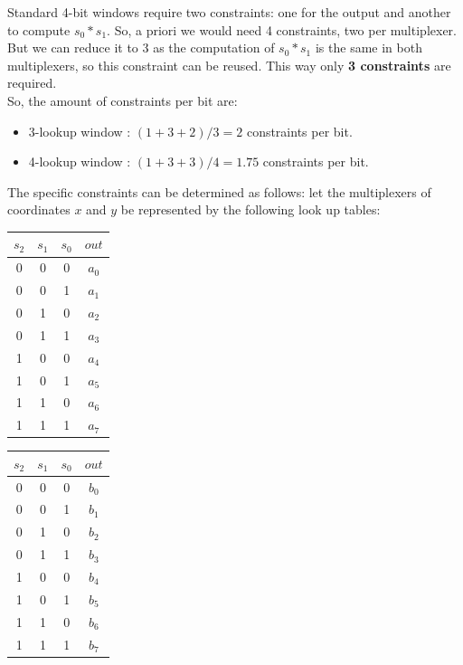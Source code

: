 \documentclass{article}
\begin{document}
\begin{spacing}{1.2}
	Standard 4-bit windows require two constraints: one for the output and another to compute $s_0*s_1$. So, a priori we would need 4 constraints, two per multiplexer. But we can reduce it to 3 as the computation of $s_0*s_1$ is the same in both multiplexers, so this constraint can be reused. This way only {{\bf 3 constraints}} are required. \\
	
	So, the amount of constraints per bit are:
	\begin{itemize}
		\item 3-lookup window : %
		$ (1+3+2)/3 = 2 $ constraints per bit.
		\item 4-lookup window : %
		$ (1 +3+3)/4 = 1.75 $ constraints per bit. 
	\end{itemize}
	
	The specific constraints can be determined as follows: let the multiplexers of coordinates $x$ and $y$ be represented by the following look up tables:\\
	
	\begin{table}[h]
		\begin{minipage}{.5\linewidth}
			\centering
			\begin{tabular}{c|c|c|c}
				$s_2$ & $s_1$ & $s_0$ & $out$\\
				\hline
				0 & 0 & 0 & $a_0$\\
				0 & 0 & 1 & $a_1$\\
				0 & 1 & 0 & $a_2$\\
				0 & 1 & 1 & $a_3$\\
				1 & 0 & 0 & $a_4$\\
				1 & 0 & 1 & $a_5$\\
				1 & 1 & 0 & $a_6$\\
				1 & 1 & 1 & $a_7$
			\end{tabular}
		\end{minipage}%
		\begin{minipage}{.5\linewidth}
			\centering
			\begin{tabular}{c|c|c|c}
				$s_2$ & $s_1$ & $s_0$ & $out$\\
				\hline
				0 & 0 & 0 & $b_0$\\
				0 & 0 & 1 & $b_1$\\
				0 & 1 & 0 & $b_2$\\
				0 & 1 & 1 & $b_3$\\
				1 & 0 & 0 & $b_4$\\
				1 & 0 & 1 & $b_5$\\
				1 & 1 & 0 & $b_6$\\
				1 & 1 & 1 & $b_7$
			\end{tabular}
		\end{minipage} 
	\end{table}
	

\end{spacing}
\end{document}
